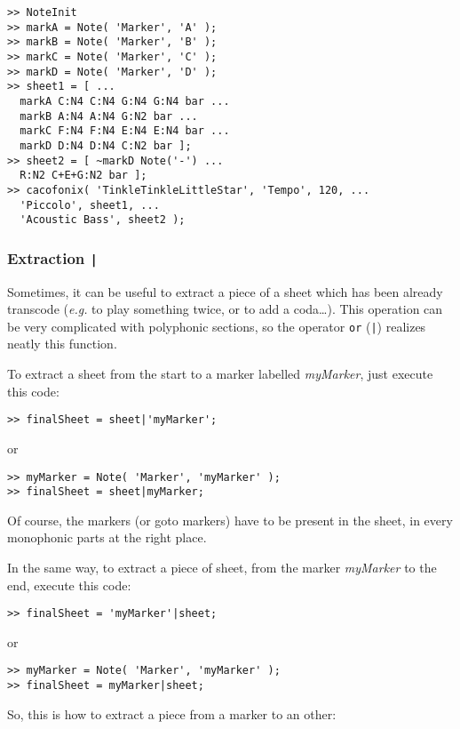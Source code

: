 \documentclass{article}
\newcommand{\eg}{\emph{e.g.}\xspace}
\begin{document}
\begin{lstlisting}
>> NoteInit
>> markA = Note( 'Marker', 'A' );
>> markB = Note( 'Marker', 'B' );
>> markC = Note( 'Marker', 'C' );
>> markD = Note( 'Marker', 'D' );
>> sheet1 = [ ...
  markA C:N4 C:N4 G:N4 G:N4 bar ...
  markB A:N4 A:N4 G:N2 bar ...
  markC F:N4 F:N4 E:N4 E:N4 bar ...
  markD D:N4 D:N4 C:N2 bar ];
>> sheet2 = [ ~markD Note('-') ...
  R:N2 C+E+G:N2 bar ];
>> cacofonix( 'TinkleTinkleLittleStar', 'Tempo', 120, ...
  'Piccolo', sheet1, ...
  'Acoustic Bass', sheet2 );
\end{lstlisting}

\subsubsection{Extraction \lstinline!|!}
\label{sec:Extraction}

Sometimes, it can be useful to extract a piece of a sheet which has been already transcode (\eg to play something twice, or to add a coda\dots). This operation can be very complicated with polyphonic sections, so the operator \lstinline!or! (\lstinline!|!) realizes neatly this function.

To extract a sheet from the start to a marker labelled \emph{myMarker}, just execute this code:
\begin{lstlisting}
>> finalSheet = sheet|'myMarker';
\end{lstlisting}
or
\begin{lstlisting}
>> myMarker = Note( 'Marker', 'myMarker' );
>> finalSheet = sheet|myMarker;
\end{lstlisting}
Of course, the markers (or goto markers) have to be present in the sheet, in every monophonic parts at the right place.

In the same way, to extract a piece of sheet, from the marker \emph{myMarker} to the end, execute this code:
\begin{lstlisting}
>> finalSheet = 'myMarker'|sheet;
\end{lstlisting}
or
\begin{lstlisting}
>> myMarker = Note( 'Marker', 'myMarker' );
>> finalSheet = myMarker|sheet;
\end{lstlisting}

So, this is how to extract a piece from a marker to an other: \\
\end{document}
